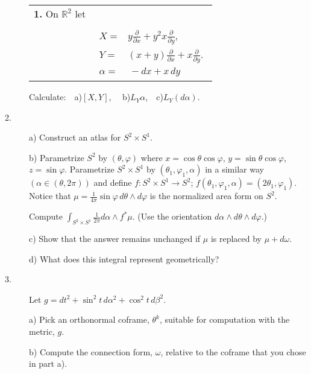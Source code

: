 \documentclass[bbb]{report}
\def\ds{\displaystyle}
\def\R{{\mathbb R}}
\begin{document}
\begin{description}

\item[]
\hspace{-.2truein}
\begin{tabular}{ll}
{\bf 1.} On $\R^2$ let &\\& \vspace{-.5in}\\&
$\begin{array}{ll}
X=&y\ds\frac{\partial}{\partial x}+y^2x\frac{\partial}{\partial y},\\
Y=&(x+y)\ds\frac{\partial}{\partial x} + x\frac{\partial}{\partial y}.\\
\alpha=&\,-dx+x\,dy
\end{array}$
\end{tabular}

\item[]
Calculate:\ \ a)$[X,Y]$, \ \ b)$L_Y\alpha$,\ \ c)$L_Y(d\alpha)$.

\item[2.] a)
Construct an atlas for $S^2\times S^1$.

\item[\quad] b)
Parametrize $S^2$ by $(\theta,\varphi)$ where
$x=\cos\theta\cos\varphi$,
$y=\sin\theta\cos\varphi$,
$z=\sin \varphi$.
Parametrize $S^2\times S^1$ by $(\theta_1, \varphi_1, \alpha)$
in a similar way
$(\alpha\in(\theta,2\pi))$
and define $f:S^2\times S^1\to S^2$;
$f(\theta_1,\varphi_1,\alpha)=(2\theta_1,\varphi_1)$.
Notice that $\mu=\ds\frac{1}{4\pi}\sin\varphi\,d\theta \wedge d\varphi$
is the normalized area form on $S^2$.

\item[]
Compute $\ds\int_{S^2\times S^1} \frac{1}{2\pi}d\alpha\wedge f^\ast\mu$.
(Use the orientation $d\alpha\wedge d\theta\wedge d\varphi$.)

\item[\quad] c)
Show that the answer remains unchanged if $\mu$ is replaced by
$\mu +d\omega$.

\item[\quad] d)
What does this integral represent geometrically?

\item[3.]
Let $g=dt^2+\sin^2t\,d\alpha^2+\cos^2t\,d\beta^2$.

\item[\quad] a)
Pick an orthonormal coframe, $\theta^k$, suitable for computation with the
metric, $g$.

\item[\quad] b)
Compute the connection form, $\omega$, relative to the coframe that you
chose in part a).


\end{description}
\end{document}
